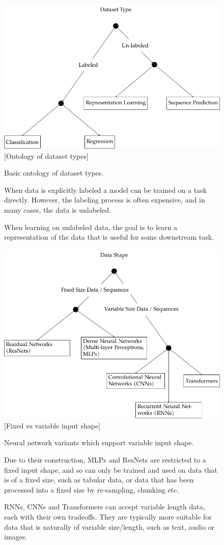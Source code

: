\begin{figure}
        \centering
        \includegraphics[width=.7\linewidth]{figures/ontology-2-task.pdf}
        \vspace{1cm}
        \captionsetup{parskip=7pt}
        [Ontology of dataset types]{
            Basic ontology of dataset types.

            When data is explicitly labeled a model can be trained on a task directly. However, the labeling process is often expensive, and in many cases, the data is unlabeled.

            When learning on unlabeled data, the goal is to learn a representation of the data that is useful for some downstream task.
        }
        \label{fig:ontology-task}
\end{figure}

\begin{figure}
        \centering
        \includegraphics[width=.7\linewidth]{figures/ontology-3-input-shape.pdf}
        \vspace{1cm}
        \captionsetup{parskip=7pt}
        [Fixed vs variable input shape]{Neural network variants which support variable input shape.

        Due to their construction, MLPs and ResNets are restricted to a fixed input shape, and so can only be trained and used on data that is of a fixed size, such as tabular data, or data that has been processed into a fixed size by re-sampling, chunking etc.

        RNNs, CNNs and Transformers can accept variable length data, each with their own tradeoffs. They are typically more suitable for data that is naturally of variable size/length, such as text, audio or images.}
        \label{fig:ontology-input-shape}
\end{figure}


